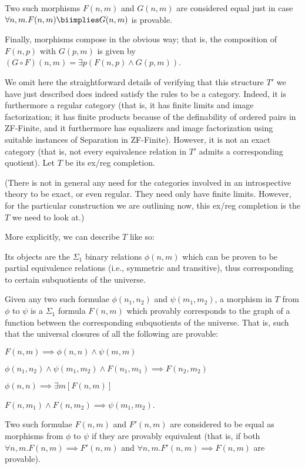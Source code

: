 Two such morphisms $F(n, m)$ and $G(n, m)$ are considered equal just in case $\forall n, m . F(n, m) \biimplies G(n, m)$ is provable. 

Finally, morphisms compose in the obvious way; that is, the composition of $F(n, p)$ with $G(p, m)$ is given by $(G \circ F)(n, m) = \exists p (F(n, p) \wedge G(p, m))$.

We omit here the straightforward details of verifying that this structure $T'$ we have just described does indeed satisfy the rules to be a category. Indeed, it is furthermore a regular category (that is, it has finite limits and image factorization; it has finite products because of the definability of ordered pairs in ZF-Finite, and it furthermore has equalizers and image factorization using suitable instances of Separation in ZF-Finite). However, it is not an exact category (that is, not every equivalence relation in $T'$ admits a corresponding quotient). Let $T$ be its ex/reg completion.

(There is not in general any need for the categories involved in an introspective theory to be exact, or even regular. They need only have finite limits. However, for the particular construction we are outlining now, this ex/reg completion is the $T$ we need to look at.)

More explicitly, we can describe $T$ like so:

Its objects are the $\Sigma_1$ binary relations $\phi(n, m)$ which can be proven to be partial equivalence relations (i.e., symmetric and transitive), thus corresponding to certain subquotients of the universe.

Given any two such formulae $\phi(n_1, n_2)$ and $\psi(m_1, m_2)$, a morphism in $T$ from $\phi$ to $\psi$ is a $\Sigma_1$ formula $F(n, m)$ which provably corresponds to the graph of a function between the corresponding subquotients of the universe. That is, such that the universal closures of all the following are provable:

$F(n, m) \implies \phi(n, n) \wedge \psi(m, m)$

$\phi(n_1, n_2) \wedge \psi(m_1, m_2) \wedge F(n_1, m_1) \implies F(n_2, m_2)$

$\phi(n, n) \implies \exists m [F(n, m)]$

$F(n, m_1) \wedge F(n, m_2) \implies \psi(m_1, m_2)$.

Two such formulae $F(n, m)$ and $F'(n, m)$ are considered to be equal as morphisms from $\phi$ to $\psi$ if they are provably equivalent (that is, if both $\forall n, m . F(n, m) \implies F'(n, m)$ and $\forall n, m . F'(n, m) \implies F(n, m)$ are provable).

